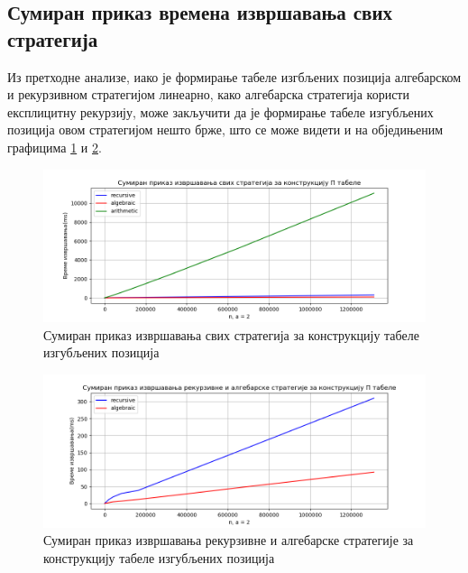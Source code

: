 \documentclass[a4paper]{article}
\begin{document}
\subsection{Сумиран приказ времена извршавања свих стратегија}

Из претходне анализе, иако је формирање табеле изгбљених позиција алгебарском и рекурзивном стратегијом линеарно, како алгебарска стратегија користи експлицитну рекурзију, може закључити да је формирање табеле изгубљених позиција овом стратегијом нешто брже, што се може видети и на обједињеним графицима \ref{fig:all} и \ref{fig:algebraicVrecursive}.

\begin{figure}[H]
	\begin{center}
		\includegraphics[width=\textwidth]{all.png}
	\end{center}
	\caption{Сумиран приказ извршавања свих стратегија за конструкцију табеле изгубљених позиција}
	\label{fig:all}
\end{figure}

\begin{figure}[H]
	\begin{center}
		\includegraphics[width=\textwidth]{algebraicVSrecursive.png}
	\end{center}
	\caption{Сумиран приказ извршавања рекурзивне и алгебарске стратегије за конструкцију табеле изгубљених позиција}
	\label{fig:algebraicVrecursive}
\end{figure}
\end{document}
